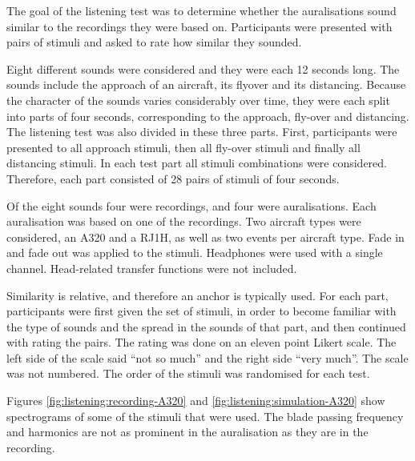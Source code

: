 The goal of the listening test was to determine whether the auralisations sound
similar to the recordings they were based on. Participants were presented with
pairs of stimuli and asked to rate how similar they sounded.


Eight different sounds were considered and they were each 12 seconds long. The
sounds include the approach of an aircraft, its flyover and its distancing.
Because the character of the sounds varies considerably over time, they were
each split into parts of four seconds, corresponding to the approach, fly-over
and distancing. The listening test was also divided in these three parts. First,
participants were presented to all approach stimuli, then all fly-over stimuli
and finally all distancing stimuli. In each test part all stimuli combinations
were considered. Therefore, each part consisted of 28 pairs of stimuli of four
seconds.

Of the eight sounds four were recordings, and four were auralisations. Each
auralisation was based on one of the recordings. Two aircraft types were
considered, an A320 and a RJ1H, as well as two events per aircraft type.
Fade in and fade out was applied to the stimuli. Headphones were used with a
single channel. Head-related transfer functions were not included.

Similarity is relative, and therefore an anchor is typically used. For each
part, participants were first given the set of stimuli, in order to become
familiar with the type of sounds and the spread in the sounds of that part, and
then continued with rating the pairs. The rating was done on an eleven point
Likert scale. The left side of the scale said ``not so much'' and the right side
``very much''. The scale was not numbered. The order of the stimuli was
randomised for each test.

Figures \ref{fig:listening:recording-A320} and
\ref{fig:listening:simulation-A320} show spectrograms of some of the stimuli
that were used. The blade passing frequency and harmonics are not as prominent
in the auralisation as they are in the recording.

